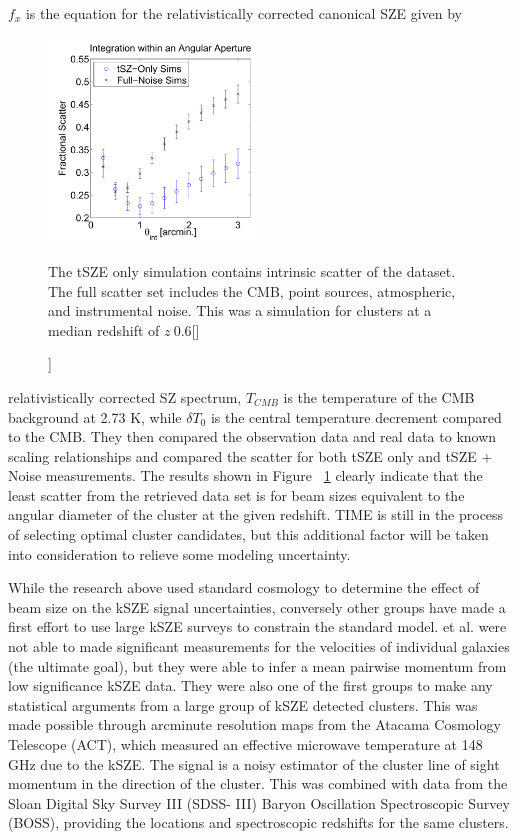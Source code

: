 \documentclass[manuscript]{aastex}
\begin{document}
$f_{x}$ is the equation for the relativistically corrected canonical SZE given by 
\begin{figure}
\vspace{-0.8cm}
  \begin{center}
    \includegraphics[width=0.5\textwidth]{saliwanchick1.png}
   \end{center}
\caption[MCMC Cluster Simulation Showing Scatter Versus Integration Angle -[\cite{Saliwanchick2013}]]{The tSZE only simulation contains intrinsic scatter of the dataset. The full scatter set includes the CMB, point sources, atmospheric, and instrumental noise. This was a simulation for clusters at a median redshift of $z ~ 0.6$[\cite{Saliwanchick2013}]}
\label{fig:sali1}
\end{figure}
relativistically corrected SZ spectrum, $T_{CMB}$ is the temperature of the CMB background at 2.73 K, while $\delta T_{0}$ is the central temperature decrement compared to the CMB. They then compared the observation data and real data to known scaling relationships and compared the scatter for both tSZE only and tSZE + Noise measurements. The results shown in Figure ~\ref{fig:sali1} clearly indicate that the least scatter from the retrieved data set is for beam sizes equivalent to the angular diameter of the cluster at the given redshift. TIME is still in the process of selecting optimal cluster candidates, but this additional factor will be taken into consideration to relieve some modeling uncertainty.  

While the research above used standard cosmology to determine the effect of beam size on the kSZE signal uncertainties, conversely other groups have made a first effort to use large kSZE surveys to constrain the standard model. \cite{Hand2012} et al. were not able to made significant measurements for the velocities of individual galaxies (the ultimate goal), but they were able to infer a mean pairwise momentum from low significance kSZE data. They were also one of the first groups to make any statistical arguments from a large group of kSZE detected clusters. This was made possible through arcminute resolution maps from the Atacama Cosmology Telescope (ACT), which measured an effective microwave temperature at 148 GHz due to the kSZE. The signal is a noisy estimator of the cluster line of sight momentum in the direction of the cluster. This was combined with data from the Sloan Digital Sky Survey III (SDSS- III) Baryon Oscillation Spectroscopic Survey (BOSS), providing the locations and spectroscopic redshifts for the same clusters. 
\end{document}
